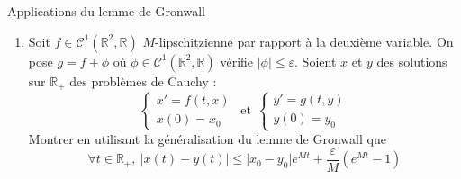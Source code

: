 \documentclass[french,a4paper]{article}
\newcommand{\R}{\mathbb{R}}
\theoremstyle{plain}
\theoremstyle{definition}
\theoremstyle{remark}
\begin{document}
\begin{ex}[Châteaux]{Applications du lemme de Gronwall}
\begin{enumerate}
\begin{enumerate}[label=\alph*.]
			\item On suppose que $p$ est intégrable sur $\R_+$. Montrer que $f$ est bornée.
		\end{enumerate}
		\item Soit $f\in\mathcal{C}^1(\R^2,\R)$ $M$-lipschitzienne par rapport à la deuxième variable. On pose $g=f+\phi$ où $\phi\in\mathcal{C}^1(\R^2,\R)$ vérifie $\lvert\phi\rvert\leqslant\varepsilon$. Soient $x$ et $y$ des solutions sur $\R_+$ des problèmes de Cauchy : $$\begin{cases}
			x'=f(t,x) \\
			x(0)=x_0
		\end{cases} \ \ \text{et} \ \ \begin{cases}
			y'=g(t,y)\\
			y(0)=y_0
		\end{cases}$$ Montrer en utilisant la généralisation du lemme de Gronwall que $$\forall t\in\R_+,\ \lvert x(t)-y(t)\rvert\leqslant\lvert x_0-y_0\rvert e^{Mt}+\frac{\varepsilon}{M}\left(e^{Mt}-1\right)$$
	\end{enumerate}
\end{ex}
\end{document}

